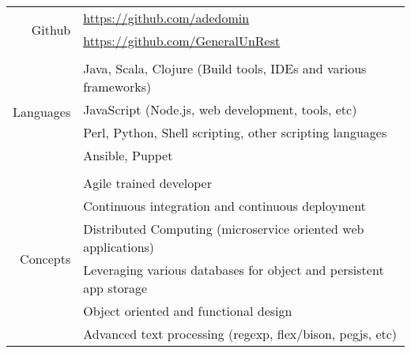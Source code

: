\documentclass[letterpaper,]{article}
\begin{document}
\begin{center}
\begin{tabular}{r|l}
    \multirow{2}{*}{Github} & \href{https://github.com/adedomin}{https://github.com/adedomin} \\
                            & \href{https://github.com/GeneralUnRest}{https://github.com/GeneralUnRest} \\
    \\
    \multirow{4}{*}{Languages} & Java, Scala, Clojure (Build tools, IDEs and various frameworks) \\
                               & JavaScript (Node.js, web development, tools, etc) \\
                               & Perl, Python, Shell scripting, other scripting languages \\
                               & Ansible, Puppet \\
    \\
    \multirow{6}{*}{Concepts} & Agile trained developer \\
                              & Continuous integration and continuous deployment \\
                              & Distributed Computing (microservice oriented web applications) \\
                              & Leveraging various databases for object and persistent app storage \\
                              & Object oriented and functional design \\
                              & Advanced text processing (regexp, flex/bison, pegjs, etc) \\
\end{tabular}
\end{center}
\end{document}
